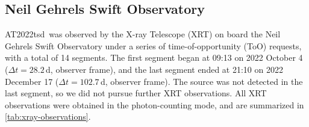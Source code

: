 \documentclass{nature_plusfigure}
\newcommand{\at}{AT2022tsd}
\begin{document}
\begin{methods}



\subsection{Neil Gehrels Swift Observatory}
\label{sec:swift}

\at\ was observed by the X-ray Telescope (XRT\cite{Burrows2005}) on board the Neil Gehrels Swift Observatory under a series of time-of-opportunity (ToO) requests, with a total of 14 segments. The first segment began at 09:13 on 2022 October 4 ($\Delta t=28.2\,$d, observer frame), and the last segment ended at 21:10 on 2022 December 17 ($\Delta t=102.7\,$d, observer frame). The source was not detected in the last segment, so we did not pursue further XRT observations.
All XRT observations were obtained in the photon-counting mode, and are summarized in \ref{tab:xray-observations}.


\end{methods}
\end{document}

